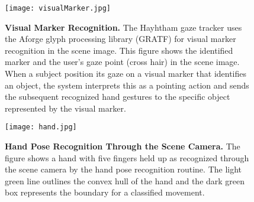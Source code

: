 \documentclass[jou,a4paper,notxfonts]{apa}
\begin{document}
\begin{figure}[tp]
 \texttt{[image: visualMarker.jpg]}
 \caption{\textbf{Visual Marker Recognition.} The Hayhtham gaze tracker uses the Aforge glyph processing library (GRATF) for visual marker recognition in the scene image. This figure shows the identified marker and the user's gaze point (cross hair) in the scene image. When a subject position  its gaze  on a visual marker that identifies an object, the system interprets this as a pointing action and sends the subsequent recognized hand gestures to the  specific object represented by the visual marker.}
 \label{visualMarker}
\end{figure}

\begin{figure}[tp]
 \texttt{[image: hand.jpg]}
 \caption{\textbf{Hand Pose Recognition Through the Scene Camera.} The figure shows a hand with five fingers held 
 up as recognized through the scene camera by the hand pose recognition routine. The light green line outlines the convex hull of the hand and the dark green box represents the boundary for a classified movement.}
 \label{hand}
\end{figure}
\end{document}
